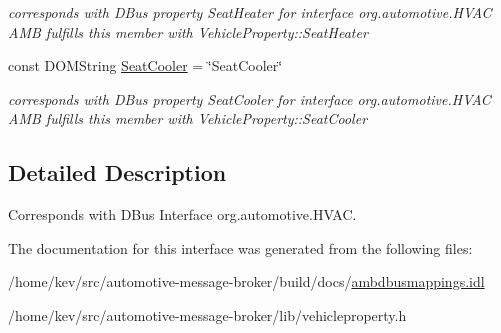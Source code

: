 \begin{DoxyCompactItemize}
\begin{DoxyCompactList}\small\item\em corresponds with D\+Bus property Seat\+Heater for interface org.\+automotive.\+H\+V\+A\+C A\+M\+B fulfills this member with Vehicle\+Property\+::\+Seat\+Heater \end{DoxyCompactList}\item 
\hypertarget{interfaceHVAC_a88527992264def26ff4df3e415ad3579}{const D\+O\+M\+String \hyperlink{interfaceHVAC_a88527992264def26ff4df3e415ad3579}{Seat\+Cooler} = \char`\"{}Seat\+Cooler\char`\"{}}\label{interfaceHVAC_a88527992264def26ff4df3e415ad3579}

\begin{DoxyCompactList}\small\item\em corresponds with D\+Bus property Seat\+Cooler for interface org.\+automotive.\+H\+V\+A\+C A\+M\+B fulfills this member with Vehicle\+Property\+::\+Seat\+Cooler \end{DoxyCompactList}\end{DoxyCompactItemize}


\subsection{Detailed Description}
Corresponds with D\+Bus Interface org.\+automotive.\+H\+V\+A\+C. 

The documentation for this interface was generated from the following files\+:\begin{DoxyCompactItemize}
\item 
/home/kev/src/automotive-\/message-\/broker/build/docs/\hyperlink{ambdbusmappings_8idl}{ambdbusmappings.\+idl}\item 
/home/kev/src/automotive-\/message-\/broker/lib/vehicleproperty.\+h\end{DoxyCompactItemize}
